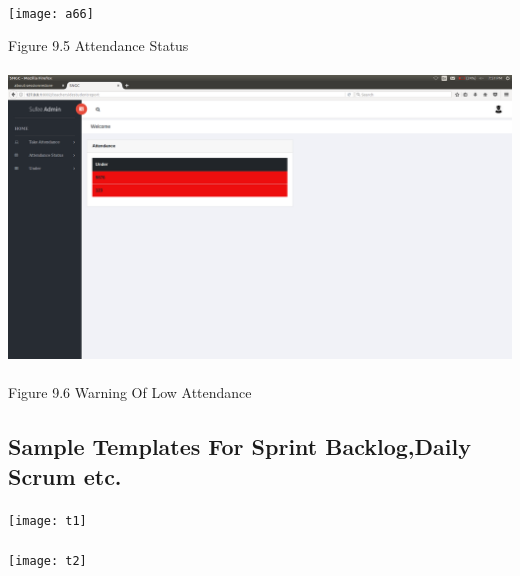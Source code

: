 \documentclass[a4paper, 12pt]{report}
\begin{document}
    \newpage
    \paragraph{}
    \texttt{[image: a66]}

     \hspace{5cm}Figure 9.5 Attendance Status
     \paragraph{}
     \paragraph{}
     \includegraphics[width=.9\textwidth]{a22}\paragraph{}
    \hspace{5cm}Figure 9.6 Warning Of Low Attendance
    \newpage
    \subsection{Sample Templates For Sprint Backlog,Daily Scrum etc.}
    \paragraph{}
   
    \texttt{[image: t1]}
  
     
     \paragraph{}
    \texttt{[image: t2]} 
     
   \paragraph{}
     
\end{document}
